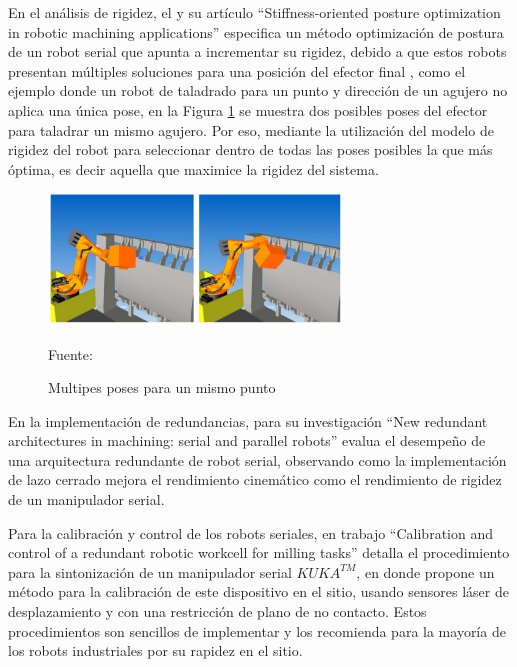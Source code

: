 En el análisis de rigidez, el \cite{guo2015stiffness} y su artículo \enquote{Stiffness-oriented posture optimization in robotic machining applications} especifica un método optimización de postura de un robot serial que apunta a incrementar su rigidez, debido a que estos robots presentan múltiples soluciones para una posición del efector final \citep{zhu2013off}, como el ejemplo donde un robot de taladrado para un punto y dirección de un agujero no aplica una única pose, en la Figura \ref{fig:13OnePointTwoPoses} se muestra dos posibles poses del efector para taladrar un mismo agujero. Por eso, \cite{guo2015stiffness} mediante la utilización del modelo de rigidez del robot para seleccionar dentro de todas las poses posibles la que más óptima, es decir aquella que maximice la rigidez del sistema.

\begin{figure}[ht!]
    \centering
    \includegraphics[width=0.7\textwidth]{Cap2_DisenoEspecificaciones/Figura/13OnePointTwoPoses.pdf}
    \caption{Multipes poses para un mismo punto}{Fuente:\citep{zhu2013off}}
    \label{fig:13OnePointTwoPoses}
\end{figure}

En la implementación de redundancias, \cite{subrin2013new} para su investigación \enquote{New redundant architectures in machining: serial and parallel robots} evalua el desempeño de una arquitectura redundante de robot serial, observando como la implementación de lazo cerrado mejora el rendimiento cinemático como el rendimiento de rigidez de un manipulador serial.

Para la calibración y control de los robots seriales, \cite{andres2011calibration} en trabajo \enquote{Calibration and control of a redundant robotic workcell for milling tasks} detalla el procedimiento para la sintonización de un manipulador serial ${KUKA}^{TM}$, en donde propone un método para la calibración de este dispositivo en el sitio, usando sensores láser de desplazamiento y con una restricción de plano de no contacto. Estos procedimientos son sencillos de implementar y los recomienda para la mayoría de los robots industriales por su rapidez en el sitio.

